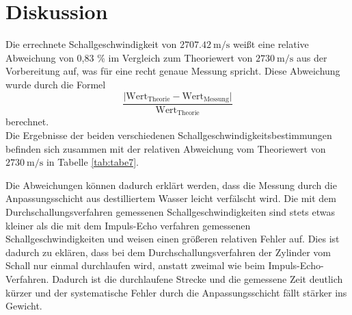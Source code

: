 \section{Diskussion}
\label{sec:Diskussion}
Die errechnete Schallgeschwindigkeit von $ \SI{2707.42}{\meter\per\second}$ weißt eine
relative Abweichung von 0,83 \% im Vergleich zum Theoriewert von $ \SI{2730}{\meter\per\second}$
aus der Vorbereitung auf, was für eine recht genaue Messung spricht. Diese Abweichung wurde
durch die Formel
\begin{equation*}
  \frac{\lvert \text{Wert}_{\text{Theorie}}-\text{Wert}_{\text{Messung}}\rvert}{\text{Wert}_{\text{Theorie}}}
  \label{eqn:abw}
\end{equation*}
berechnet.\\
Die Ergebnisse der beiden verschiedenen Schallgeschwindigkeitsbestimmungen befinden sich
zusammen mit der relativen Abweichung vom Theoriewert von $\SI{2730}{\meter\per\second}$ in
Tabelle \ref{tab:tabe7}.

Die Abweichungen können dadurch erklärt
werden, dass die Messung durch die Anpassungsschicht aus destilliertem Wasser leicht verfälscht wird.
Die mit dem Durchschallungsverfahren gemessenen Schallgeschwindigkeiten sind stets etwas
kleiner als die mit dem Impuls-Echo verfahren gemessenen Schallgeschwindigkeiten und weisen
einen größeren relativen Fehler auf. Dies ist dadurch zu eklären, dass bei dem Durchschallungsverfahren
der Zylinder vom Schall nur einmal durchlaufen wird, anstatt zweimal wie beim Impuls-Echo-Verfahren.
Dadurch ist die durchlaufene Strecke und die gemessene Zeit deutlich kürzer und der
systematische Fehler durch die Anpassungsschicht fällt stärker ins Gewicht.
